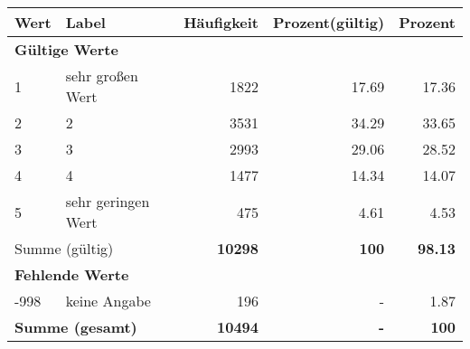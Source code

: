     \begin{longtable}{lXrrr}
     \toprule
     \textbf{Wert} & \textbf{Label} & \textbf{Häufigkeit} & \textbf{Prozent(gültig)} & \textbf{Prozent} \\
     \endhead
     \midrule
     \multicolumn{5}{l}{\textbf{Gültige Werte}}\\

     1 &
     \multicolumn{1}{X}{ sehr großen Wert   } &


       \num{1822} &
       \num[round-mode=places,round-precision=2]{17,69} &
         \num[round-mode=places,round-precision=2]{17,36} \\

     2 &
     \multicolumn{1}{X}{ 2   } &


       \num{3531} &
       \num[round-mode=places,round-precision=2]{34,29} &
         \num[round-mode=places,round-precision=2]{33,65} \\

     3 &
     \multicolumn{1}{X}{ 3   } &


       \num{2993} &
       \num[round-mode=places,round-precision=2]{29,06} &
         \num[round-mode=places,round-precision=2]{28,52} \\

     4 &
     \multicolumn{1}{X}{ 4   } &


       \num{1477} &
       \num[round-mode=places,round-precision=2]{14,34} &
         \num[round-mode=places,round-precision=2]{14,07} \\

     5 &
     \multicolumn{1}{X}{ sehr geringen Wert   } &


       \num{475} &
       \num[round-mode=places,round-precision=2]{4,61} &
         \num[round-mode=places,round-precision=2]{4,53} \\
     \midrule
     \multicolumn{2}{l}{Summe (gültig)} &
       \textbf{\num{10298}} &
     \textbf{100} &
       \textbf{\num[round-mode=places,round-precision=2]{98,13}} \\
     \multicolumn{5}{l}{\textbf{Fehlende Werte}}\\
       -998 &
       keine Angabe &
         \num{196} &
        - &
         \num[round-mode=places,round-precision=2]{1,87} \\
     \midrule
     \multicolumn{2}{l}{\textbf{Summe (gesamt)}} &
          \textbf{\num{10494}} &
        \textbf{-} &
        \textbf{100} \\
     \bottomrule
     \end{longtable}
     
